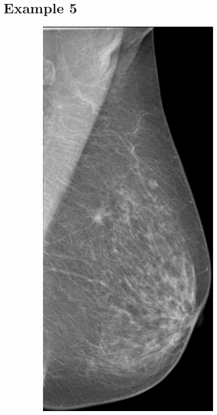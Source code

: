 \newpage
\section{Example 5}
\begin{figure}[h]
	\centering
	\begin{subfigure}{0.2\textwidth}
		\centering
			\includegraphics[width=\textwidth]{plots/examples/mammogram_5.png}

\end{subfigure}
\end{figure}
